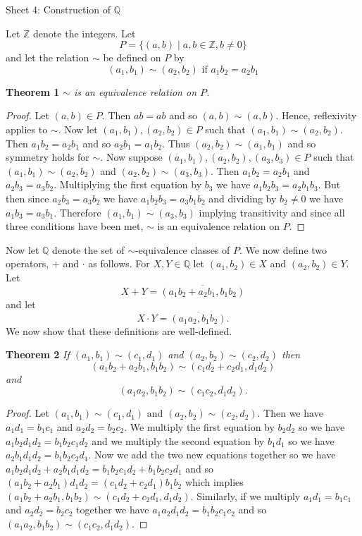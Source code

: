 \documentclass{article}
\begin{document}
\begin{flushleft}
\newpage


\Large

Sheet 4: Construction of $\mathbb{Q}$\newline

\normalsize

Let $\mathbb{Z}$ denote the integers. Let
\[
P = \{(a,b) \mid a,b \in \mathbb{Z}, b \neq 0\}
\]
and let the relation $\sim$ be defined on $P$ by
\[
(a_1,b_1) \sim (a_2,b_2) \text{ if } a_1b_2=a_2b_1
\]

\textbf{Theorem 1}
\textsl{$\sim$ is an equivalence relation on $P$.}
\begin{proof}
Let $(a,b) \in P$. Then $ab=ab$ and so $(a,b) \sim (a,b)$. Hence, reflexivity applies to $\sim$. Now let $(a_1,b_1), (a_2,b_2) \in P$ such that $(a_1,b_1) \sim (a_2,b_2)$. Then $a_1b_2=a_2b_1$ and so $a_2b_1=a_1b_2$. Thus $(a_2,b_2) \sim (a_1,b_1)$ and so symmetry holds for $\sim$. Now suppose $(a_1,b_1), (a_2,b_2), (a_3,b_3) \in P$ such that $(a_1,b_1) \sim (a_2,b_2)$ and $(a_2,b_2) \sim (a_3,b_3)$. Then $a_1b_2=a_2b_1$ and $a_2b_3=a_3b_2$. Multiplying the first equation by $b_3$ we have $a_1b_2b_3=a_2b_1b_3$. But then since $a_2b_3=a_3b_2$ we have $a_1b_2b_3=a_3b_1b_2$ and dividing by $b_2 \neq 0$ we have $a_1b_3=a_3b_1$. Therefore $(a_1,b_1) \sim (a_3,b_3)$ implying transitivity and since all three conditions have been met, $\sim$ is an equivalence relation on $P$.
\end{proof}

Now let $\mathbb{Q}$ denote the set of $\sim$-equivalence classes of $P$. We now define two operators, $+$ and $\cdot$ as follows. For $X,Y \in \mathbb{Q}$ let $(a_1,b_2) \in X$ and $(a_2,b_2) \in Y$. Let
\[
X + Y = \overline{(a_1b_2 + a_2b_1,b_1b_2)}
\]
and let
\[
X \cdot Y = \overline{(a_1a_2,b_1b_2)}.
\]
We now show that these definitions are well-defined.\newline

\textbf{Theorem 2}
\textsl{If $(a_1,b_1) \sim (c_1,d_1)$ and $(a_2,b_2) \sim (c_2,d_2)$ then
\[
(a_1b_2+a_2b_1,b_1b_2) \sim (c_1d_2+c_2d_1,d_1d_2)
\]
and
\[
(a_1a_2,b_1b_2) \sim (c_1c_2,d_1d_2).
\]}
\begin{proof}
Let $(a_1,b_1) \sim (c_1,d_1)$ and $(a_2,b_2) \sim (c_2,d_2)$. Then we have $a_1d_1=b_1c_1$ and $a_2d_2=b_2c_2$. We multiply the first equation by $b_2d_2$ so we have $a_1b_2d_1d_2 = b_1b_2c_1d_2$ and we multiply the second equation by $b_1d_1$ so we have $a_2b_1d_1d_2 = b_1b_2c_2d_1$. Now we add the two new equations together so we have $a_1b_2d_1d_2 + a_2b_1d_1d_2 = b_1b_2c_1d_2 + b_1b_2c_2d_1$ and so $(a_1b_2+a_2b_1)d_1d_2 = (c_1d_2 + c_2d_1)b_1b_2$ which implies $(a_1b_2+a_2b_1,b_1b_2) \sim (c_1d_2+c_2d_1,d_1d_2)$. Similarly, if we multiply $a_1d_1=b_1c_1$ and $a_2d_2=b_2c_2$ together we have $a_1a_2d_1d_2=b_1b_2c_1c_2$ and so $(a_1a_2,b_1b_2) \sim (c_1c_2,d_1d_2)$.
\end{proof}


\end{flushleft}
\end{document}
